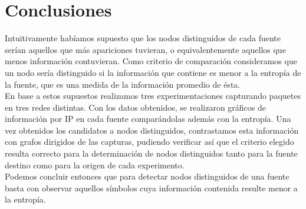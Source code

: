 




\section{Conclusiones}

\indent \indent Intuitivamente habíamos supuesto que los nodos distinguidos de cada fuente serían aquellos que más apariciones tuvieran, o equivalentemente aquellos que menos información contuvieran. Como criterio de comparación consideramos que un nodo sería distinguido si la información que contiene es menor a la entropía de la fuente, que es una medida de la información promedio de ésta.\\
\indent En base a estos supuestos realizamos tres experimentaciones capturando paquetes en tres redes distintas. Con los datos obtenidos, se realizaron gráficos de información por IP en cada fuente comparándolas además con la entropía. Una vez obtenidos los candidatos a nodos distinguidos, contrastamos esta información con grafos dirigidos de las capturas, pudiendo verificar así que el criterio elegido resulta correcto para la determinación de nodos distinguidos tanto para la fuente destino como para la origen de cada experimento.\\
\indent Podemos concluir entonces que para detectar nodos distinguidos de una fuente basta con observar aquellos símbolos cuya información contenida resulte menor a la entropía.\\ 